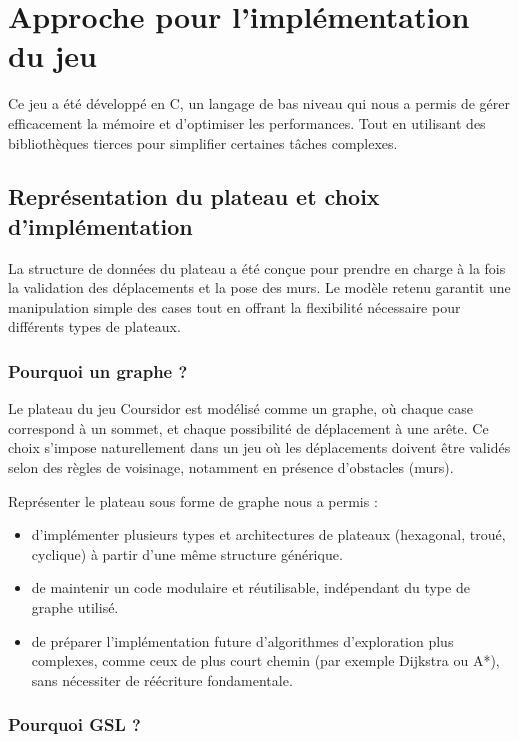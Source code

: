 \section{Approche pour l'implémentation du jeu}
\label{sec:part-salah}

Ce jeu a été développé en C, un langage de bas niveau qui nous a permis de gérer efficacement la mémoire et d'optimiser les performances. Tout en utilisant des bibliothèques tierces pour simplifier certaines tâches complexes.

\subsection{Représentation du plateau et choix d’implémentation}

La structure de données du plateau a été conçue pour prendre en charge à la fois la validation des déplacements et la pose des murs. Le modèle retenu garantit une manipulation simple des cases tout en offrant la flexibilité nécessaire pour différents types de plateaux.

\subsubsection{Pourquoi un graphe ?}

Le plateau du jeu Coursidor est modélisé comme un graphe, où chaque case correspond à un sommet, et chaque possibilité de déplacement à une arête. Ce choix s’impose naturellement dans un jeu où les déplacements doivent être validés selon des règles de voisinage, notamment en présence d'obstacles (murs).

Représenter le plateau sous forme de graphe nous a permis :
\begin{itemize}
    \item d’implémenter plusieurs types et architectures de plateaux (hexagonal, troué, cyclique) à partir d’une même structure générique.
    \item de maintenir un code modulaire et réutilisable, indépendant du type de graphe utilisé.
    \item de préparer l’implémentation future d’algorithmes d’exploration plus complexes, comme ceux de plus court chemin (par exemple Dijkstra ou A*), sans nécessiter de réécriture fondamentale.
\end{itemize}

\subsubsection{Pourquoi GSL ?}

